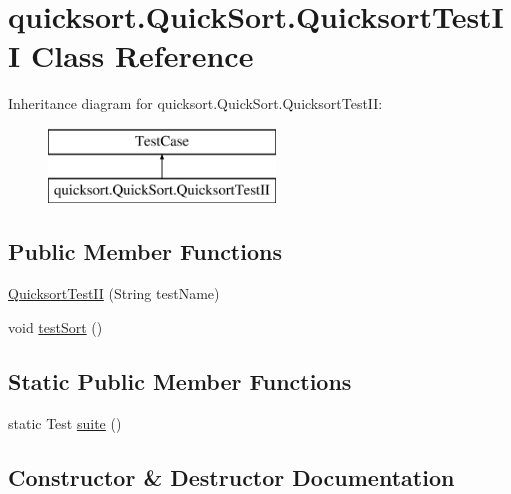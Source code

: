 \hypertarget{classquicksort_1_1_quick_sort_1_1_quicksort_test_i_i}{}\section{quicksort.\+Quick\+Sort.\+Quicksort\+Test\+II Class Reference}
\label{classquicksort_1_1_quick_sort_1_1_quicksort_test_i_i}
Inheritance diagram for quicksort.\+Quick\+Sort.\+Quicksort\+Test\+II\+:\begin{figure}[H]
\begin{center}
\leavevmode
\includegraphics[height=2.000000cm]{classquicksort_1_1_quick_sort_1_1_quicksort_test_i_i}
\end{center}
\end{figure}
\subsection*{Public Member Functions}
\begin{DoxyCompactItemize}
\item 
\hyperlink{classquicksort_1_1_quick_sort_1_1_quicksort_test_i_i_a567725c5d5a442dc2595263088ca10d0}{Quicksort\+Test\+II} (String test\+Name)
\item 
void \hyperlink{classquicksort_1_1_quick_sort_1_1_quicksort_test_i_i_a6fd2e0679470e8845e27c1c08cc03af0}{test\+Sort} ()
\end{DoxyCompactItemize}
\subsection*{Static Public Member Functions}
\begin{DoxyCompactItemize}
\item 
static Test \hyperlink{classquicksort_1_1_quick_sort_1_1_quicksort_test_i_i_a8e8b2645a480a690df591548c89c5245}{suite} ()
\end{DoxyCompactItemize}


\subsection{Constructor \& Destructor Documentation}
\hypertarget{classquicksort_1_1_quick_sort_1_1_quicksort_test_i_i_a567725c5d5a442dc2595263088ca10d0}{}\label{classquicksort_1_1_quick_sort_1_1_quicksort_test_i_i_a567725c5d5a442dc2595263088ca10d0} 
